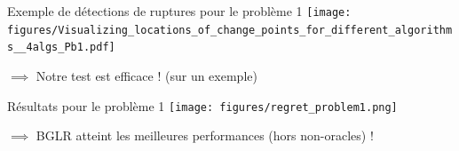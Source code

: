 \documentclass[11pt,french,ignorenonframetext,]{beamer}
\begin{document}
\begin{frame}[plain]{Exemple de détections de ruptures pour le problème 1}
  \centering
  \texttt{[image: figures/Visualizing\_locations\_of\_change\_points\_for\_different\_algorithms\_\_4algs\_Pb1.pdf]}

  $\implies$ Notre test est efficace !
  (sur un exemple)
\end{frame}

\begin{frame}[plain]{Résultats pour le problème 1}
  \centering
  \texttt{[image: figures/regret\_problem1.png]}

  $\implies$ BGLR atteint les meilleures performances (hors non-oracles) \dCooley{} !
\end{frame}












\end{document}
